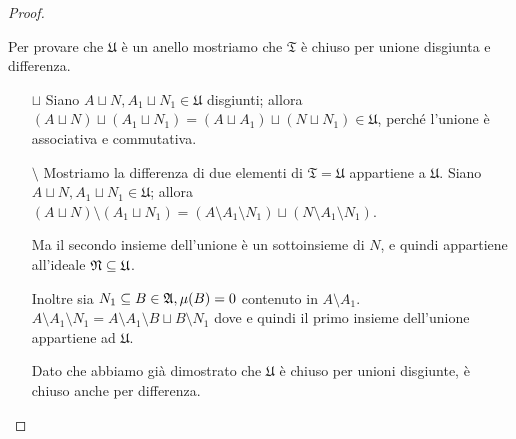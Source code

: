\documentclass[../EserciziIstituzioniAnalisi.tex]{subfiles}
\begin{document}
\begin{proof}
\begin{enumerate}
\begin{itemize}
      Per provare che $\mathfrak{U}$ è un anello mostriamo che $\mathfrak{T}$ è chiuso per unione disgiunta e differenza.
      \begin{itemize}
        \item[$\sqcup$] Siano $A\sqcup N, A_1\sqcup N_1\in\mathfrak{U}$ disgiunti; allora $(A\sqcup N) \sqcup (A_1\sqcup N_1)= (A \sqcup A_1) \sqcup (N\sqcup N_1)\in\mathfrak{U}$, perché l'unione è associativa e commutativa.
        \item[$\setminus$] Mostriamo la differenza di due elementi di $\mathfrak{T}=\mathfrak{U}$ appartiene a $\mathfrak{U}$. Siano $A\sqcup N, A_1\sqcup N_1\in\mathfrak{U}$; allora $(A\sqcup N) \setminus (A_1\sqcup N_1)=(A\setminus A_1\setminus N_1) \sqcup (N\setminus A_1\setminus N_1)$.

        Ma il secondo insieme dell'unione è un sottoinsieme di $N$, e quindi appartiene all'ideale $\mathfrak N\subseteq \mathfrak{U}$.

        Inoltre sia $N_1\subseteq B\in \mathfrak A, \mu(B)=0$ contenuto in $A\setminus A_1$. $A\setminus A_1\setminus N_1=A\setminus A_1\setminus B \sqcup B\setminus N_1$ dove e quindi il primo insieme dell'unione appartiene ad $\mathfrak{U}$.

        Dato che abbiamo già dimostrato che $\mathfrak{U}$ è chiuso per unioni disgiunte, è chiuso anche per differenza.
      \end{itemize}
    \end{itemize}
  \end{enumerate}
\end{proof}
\end{document}
